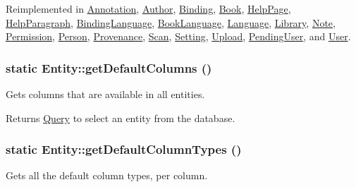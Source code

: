 Reimplemented in \hyperlink{classAnnotation_a0081ac8f6cf11cce9ca0e6e4ed5d9ffc}{Annotation}, \hyperlink{classAuthor_a305006a9a8889149f9103b1c5d762aa9}{Author}, \hyperlink{classBinding_aded437d056ec24770d8bf4eebdeec36e}{Binding}, \hyperlink{classBook_afeabb3df0ca3af21d93d2c6d2be84fe6}{Book}, \hyperlink{classHelpPage_abf83884baba4ef17e2d9f2510661f1dd}{HelpPage}, \hyperlink{classHelpParagraph_ae270d97d244d3c71ec843e062af29f2c}{HelpParagraph}, \hyperlink{classBindingLanguage_a2555fe5224b885813f810b249a0fbefb}{BindingLanguage}, \hyperlink{classBookLanguage_a3ec4af1722ff86f65464a563f7c21d12}{BookLanguage}, \hyperlink{classLanguage_a6e5cf86376e603ee4945b514fb6de7bd}{Language}, \hyperlink{classLibrary_aa18ef5cf611b855ccbe55283b41e93b6}{Library}, \hyperlink{classNote_afb67f78e11e21140b15735ce5a78d5ba}{Note}, \hyperlink{classPermission_a0040cda21f71bbcdf478c9e8f1996d6d}{Permission}, \hyperlink{classPerson_aed60680c05bbf313249396521da7df27}{Person}, \hyperlink{classProvenance_a3d14641b8cfcb3dbf226e82d684ab275}{Provenance}, \hyperlink{classScan_a9ae3218caa7bc866a8b914eab7b649a2}{Scan}, \hyperlink{classSetting_afde410fc459b142b11a50511414dc57d}{Setting}, \hyperlink{classUpload_a2de5133464c9577aff228f8bb543929e}{Upload}, \hyperlink{classPendingUser_ab157c3fddef5e3fc0e85f40a66033f78}{PendingUser}, and \hyperlink{classUser_a2b6212bf34a2be45394c9a0a1220855c}{User}.

\hypertarget{classEntity_a828b6c093a3ffeb5d1828fb539b4c001}{
\subsubsection[{getDefaultColumns}]{\setlength{\rightskip}{0pt plus 5cm}static Entity::getDefaultColumns ()}}
\label{classEntity_a828b6c093a3ffeb5d1828fb539b4c001}
Gets columns that are available in all entities.

\begin{DoxyReturn}{Returns}
\hyperlink{classQuery}{Query} to select an entity from the database. 
\end{DoxyReturn}
\hypertarget{classEntity_af257dd951ed9b221a1d1efd45ea51db3}{
\subsubsection[{getDefaultColumnTypes}]{\setlength{\rightskip}{0pt plus 5cm}static Entity::getDefaultColumnTypes ()}}
\label{classEntity_af257dd951ed9b221a1d1efd45ea51db3}
Gets all the default column types, per column.

